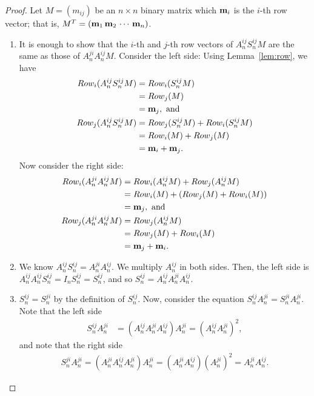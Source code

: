 \begin{proof}
    Let $ M = (m_{ij}) $ be an $ n \times n $ binary matrix which $ \mathbf{m}_i $ is the $ i $-th row vector; that is, $ M^T = (\mathbf{m}_1 \, \mathbf{m}_2 \, \cdots \, \mathbf{m}_n) $.
    \begin{enumerate}
    \item It is enough to show that the $ i $-th and $ j $-th row vectors of $ A_n^{ij} S_n^{ij} M $ are the same as those of $ A_n^{ji} A_n^{ij} M $.
        Consider the left side: Using Lemma~\ref{lem:row}, we have 
        \begin{align*}
        Row_i(A_n^{ij} S_n^{ij} M) &= Row_i(S_n^{ij} M) \\
        &= Row_j(M) \\
        &= \mathbf{m}_j, \text{ and} \\
        Row_j(A_n^{ij} S_n^{ij} M) &= Row_j(S_n^{ij} M) + Row_i(S_n^{ij} M) \\
        &= Row_i(M) + Row_j(M) \\
        &= \mathbf{m}_i + \mathbf{m}_j.
        \end{align*}
        Now consider the right side:
        \begin{align*}
        Row_i(A_n^{ji} A_n^{ij} M) &= Row_i(A_n^{ij} M) + Row_j(A_n^{ij} M) \\
        &= Row_i(M) + \left( Row_j(M) + Row_i(M) \right) \\
        &= \mathbf{m}_j, \text{ and} \\
        Row_j(A_n^{ji} A_n^{ij} M) &= Row_j(A_n^{ij} M) \\
        &= Row_j(M) + Row_i(M) \\
        &= \mathbf{m}_j + \mathbf{m}_i.
        \end{align*}
    \item We know $ A_n^{ij} S_n^{ij} = A_n^{ji} A_n^{ij} $. We multiply $ A_n^{ij} $ in both sides.
        Then, the left side is $ A_n^{ij} A_n^{ij} S_n^{ij} = I_n S_n^{ij} = S_n^{ij} $, and so $ S_n^{ij} = A_n^{ij} A_n^{ji} A_n^{ij} $.
    \item $ S_n^{ij} = S_n^{ji} $ by the definition of $ S_n^{ij} $.
        Now, consider the equation $ S_n^{ij} A_n^{ji} = S_n^{ji} A_n^{ji} $.
        Note that the left side
        \begin{align*}
            S_n^{ij} A_n^{ji} &= \left( A_n^{ij} A_n^{ji} A_n^{ij} \right) A_n^{ji} = \left( A_n^{ij} A_n^{ji} \right)^2,
        \end{align*}
        and note that the right side
        \begin{align*}
            S_n^{ji} A_n^{ji} = \left( A_n^{ji} A_n^{ij} A_n^{ji} \right) A_n^{ji} = \left( A_n^{ji} A_n^{ij} \right) \left( A_n^{ji} \right)^2 = A_n^{ji} A_n^{ij}.
        \end{align*}
    \end{enumerate}
\end{proof}

